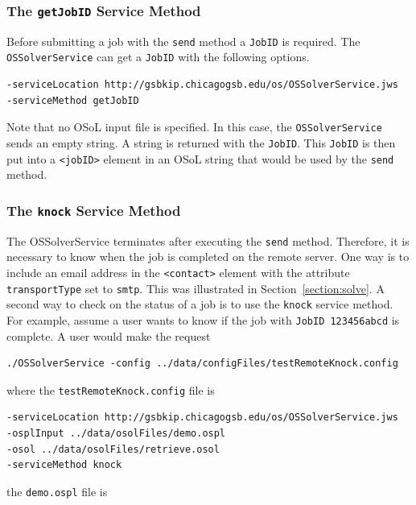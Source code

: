 \documentclass[11pt]{article}
\renewcommand{\_}{{\char"5F}}
\renewcommand{\{}{{\char"7B}}
\renewcommand{\}}{{\char"7D}}
\renewcommand{\^}{{\char"0D}}
\renewcommand{\'}{{\char"0D}}
\begin{document}
\begin{enumerate}[Step 1:]
\subsubsection{The  {\tt getJobID} Service Method}\label{section:getjobid}

Before  submitting a job with the {\tt send} method a {\tt JobID}
is required. The {\tt OSSolverService} can get a {\tt JobID} with the following options.
\begin{verbatim}
-serviceLocation http://gsbkip.chicagogsb.edu/os/OSSolverService.jws
-serviceMethod getJobID
\end{verbatim}
Note that no OSoL input file is specified. In this case, the {\tt OSSolverService} sends an empty string.
A string is returned with the {\tt JobID}. This {\tt JobID} is then put into a {\tt <jobID>} element in an
OSoL string that would be used by the {\tt send} method.


\subsubsection{The  {\tt knock} Service Method}\label{section:knock}

The OSSolverService terminates after executing the {\tt send} method. Therefore,
it is necessary to know when the job is completed on the remote server. One way is to include an email
address in the  {\tt <contact>}  element with the attribute {\tt transportType} set to {\tt smtp}.
This was illustrated in Section~\ref{section:solve}.  A second way to check on the status of a job is
to use the {\tt knock} service method.  For example, assume a user   wants to know if  the job
with {\tt JobID 123456abcd}  is complete. A user would make the request
\begin{verbatim}
./OSSolverService -config ../data/configFiles/testRemoteKnock.config
\end{verbatim}
where the {\tt testRemoteKnock.config} file is
\begin{verbatim}
-serviceLocation http://gsbkip.chicagogsb.edu/os/OSSolverService.jws
-osplInput ../data/osolFiles/demo.ospl
-osol ../data/osolFiles/retrieve.osol
-serviceMethod knock
\end{verbatim}
the {\tt demo.ospl} file is



\end{enumerate}
\end{document}

